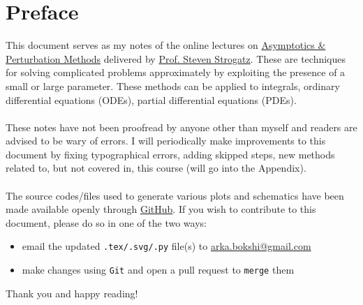 \chapter*{Preface}

This document serves as my notes of the online lectures on \href{https://www.youtube.com/watch?v=KZsk8B_z8pI&list=PL5EH0ZJ7V0jV7kMYvPcZ7F9oaf_YAlfbI}{Asymptotics \& Perturbation Methods} delivered by \href{https://www.stevenstrogatz.com/}{Prof. Steven Strogatz}. These are techniques for solving complicated problems approximately by exploiting the presence of a small or large parameter. These methods can be applied to integrals, ordinary differential equations (ODEs), partial differential equations (PDEs).\\\\
These notes have not been proofread by anyone other than myself and readers are advised to be wary of errors. I will periodically make improvements to this document by fixing typographical errors, adding skipped steps, new methods related to, but not covered in, this course (will go into the Appendix). \\\\
The source codes/files used to generate various plots and schematics have been made available openly through \href{https://github.com/arkabokshi/asymptotics-perturbation-methods}{GitHub}. If you wish to contribute to this document, please do so in one of the two ways:
\begin{itemize}
	\item email the updated \texttt{.tex/.svg/.py} file(s) to \href{arka.bokshi@gmail.com}{arka.bokshi@gmail.com}
	\item make changes using \texttt{Git} and open a pull request to \texttt{merge} them
\end{itemize}
Thank you and happy reading!


